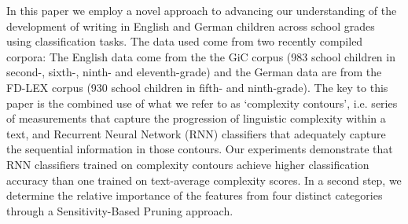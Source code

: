 In this paper we employ a novel approach to advancing our understanding of the development of writing in English and German children across school grades using classification tasks. The data used come from two recently compiled corpora: The English data come from the the GiC corpus (983 school children in second-, sixth-, ninth- and eleventh-grade) and the German data are from the FD-LEX corpus (930 school children in fifth- and ninth-grade). The key to this paper is the combined use of what we refer to as `complexity contours', i.e. series of measurements that capture the progression of linguistic complexity within a text, and Recurrent Neural Network (RNN) classifiers that adequately capture the sequential information in those contours. Our experiments demonstrate that RNN classifiers trained on complexity contours achieve higher classification accuracy than one trained on text-average complexity scores. In a second step, we determine the relative importance of the features from four distinct categories through a Sensitivity-Based Pruning approach.
